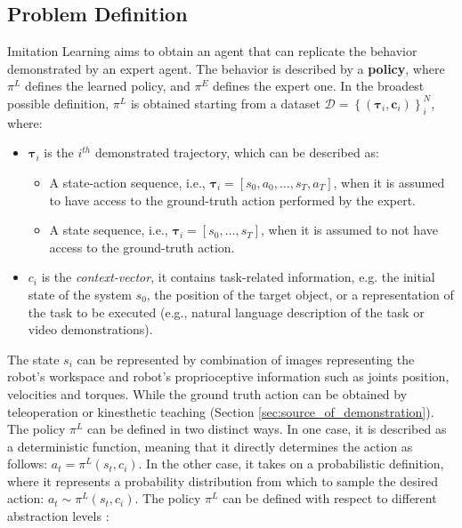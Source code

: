 \subsection{Problem Definition}
\label{sec:problem_formulation}
Imitation Learning aims to obtain an agent that can replicate the behavior demonstrated by an expert agent. The behavior is described by a \textbf{policy}, where $\pi^{L}$ defines the learned policy, and $\pi^{E}$ defines the expert one. In the broadest possible definition, $\pi^{L}$ is obtained starting from a dataset $\mathcal{D}=\left \{ \left ( \boldsymbol{\tau}_{i}, \boldsymbol{c}_{i}\right ) \right \}_{i}^{N}$, where:
\begin{itemize}
    \item $\boldsymbol{\tau}_{i}$ is the $i^{th}$ demonstrated trajectory, which can be described as:
          \begin{itemize}
              \item A state-action sequence, i.e., $\boldsymbol{\tau}_{i} = [s_{0}, a_{0}, \dots, s_{T}, a_{T}]$, when it is assumed to have access to the ground-truth action performed by the expert.
              \item A state sequence, i.e., $\boldsymbol{\tau}_{i} = [s_{0}, \dots, s_{T}]$, when it is assumed to not have access to the ground-truth action.
          \end{itemize}
    \item $c_{i}$ is the \textit{context-vector}, it contains task-related information, e.g. the initial state of the system $s_{0}$, the position of the target object, or a representation of the task to be executed (e.g., natural language description of the task or video demonstrations).
\end{itemize}
The state $s_{i}$ can be represented by combination of images representing the robot's workspace and robot's proprioceptive information such as joints position, velocities and torques. While the ground truth action can be obtained by teleoperation or kinesthetic teaching (Section \ref{sec:source_of_demonstration}).
\newline The policy $\pi^{L}$ can be defined in two distinct ways. In one case, it is described as a deterministic function, meaning that it directly determines the action as follows: $a_{t} = \pi^{L}(s_{t}, c_{i})$. In the other case, it takes on a probabilistic definition, where it represents a probability distribution from which to sample the desired action: $a_{t} \sim \pi^{L}(s_{t}, c_{i})$.
\newline The policy $\pi^{L}$ can be defined with respect to different abstraction levels \cite{fang2019survey,osa2018algorithmic}:
